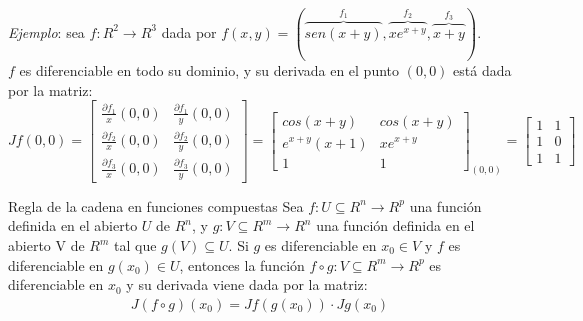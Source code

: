 \documentclass[a4paper, twoside]{article}
\numberwithin{equation}{section}
\numberwithin{figure}{section}
\numberwithin{table}{section}
\begin{document}
\textit{Ejemplo}: sea $f: R^2 \to R^3$ dada por $f(x,y)=(\overbrace{sen\left(x+y\right)}^{f_1},\overbrace{xe^{x+y}}^{f_2},\overbrace{x+y}^{f_3})$.\\

$f$ es diferenciable en todo su dominio, y su derivada en el punto $(0,0)$ está dada por la matriz:\\

$Jf(0,0)=\left[
	\begin{array}{cc}
		\frac{\partial f_{1}}{x}\left(0,0\right) & \frac{\partial f_{1}}{y}\left(0,0\right)\\
		\frac{\partial f_{2}}{x}\left(0,0\right) & \frac{\partial f_{2}}{y}\left(0,0\right)\\
		\frac{\partial f_{3}}{x}\left(0,0\right) & \frac{\partial f_{3}}{y}\left(0,0\right)
	\end{array}\right]=\left[
	\begin{array}{cc}
		cos\left(x+y\right) & cos\left(x+y\right)\\
		e^{x+y}\left(x+1\right) & xe^{x+y}\\
		1 & 1
	\end{array}\right]_{(0,0)}=\left[
	\begin{array}{cc}
		1 & 1\\
		1 & 0\\
		1 & 1
	\end{array}\right]$

\vspace{0.5cm}

\begin{teorema*}{Regla de la cadena en funciones compuestas}
	Sea $f:U\subseteq R^n \to R^p$ una función definida en el abierto $U$ de $R^n$, y $g:V\subseteq R^m \to R^n$ una función definida en el abierto V de $R^m$ tal que $g(V)\subseteq U.$ Si $g$ es diferenciable en $x_0\in V$ y $f$ es diferenciable en $g(x_0)\in U$, entonces la función $f\circ g:V\subseteq R^m \to R^p$ es diferenciable en $x_0$ y su derivada viene dada por la matriz:
	\begin{align}
		J(f\circ g)(x_0)=Jf(g(x_0))\cdot Jg(x_0)
	\end{align}
\end{teorema*}
\end{document}

